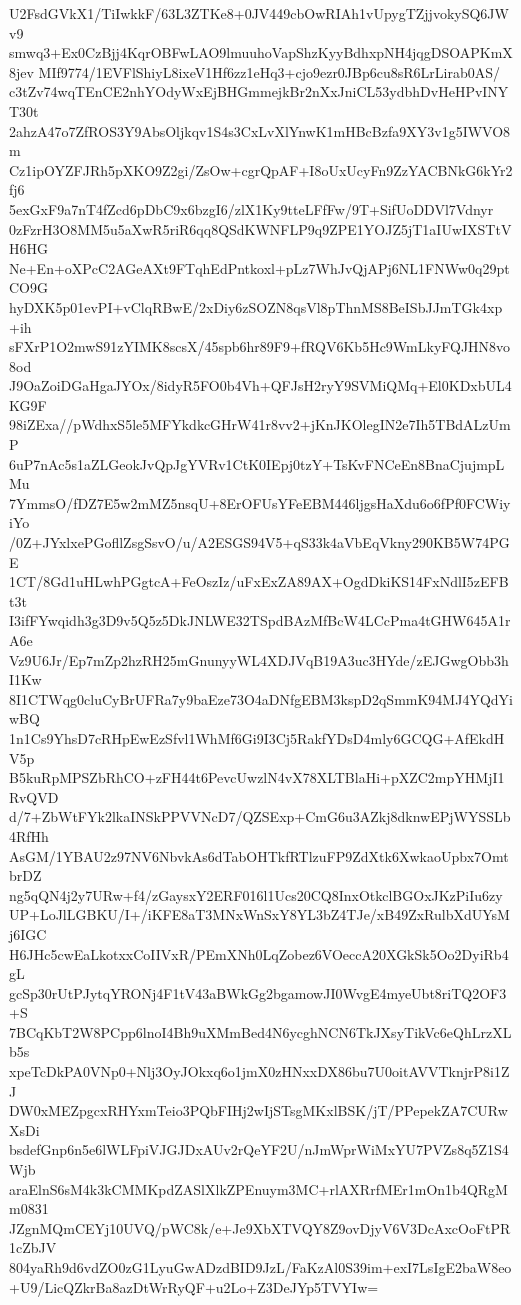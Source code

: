 U2FsdGVkX1/TiIwkkF/63L3ZTKe8+0JV449cbOwRIAh1vUpygTZjjvokySQ6JWv9
smwq3+Ex0CzBjj4KqrOBFwLAO9lmuuhoVapShzKyyBdhxpNH4jqgDSOAPKmX8jev
MIf9774/1EVFlShiyL8ixeV1Hf6zz1eHq3+cjo9ezr0JBp6cu8sR6LrLirab0AS/
c3tZv74wqTEnCE2nhYOdyWxEjBHGmmejkBr2nXxJniCL53ydbhDvHeHPvINYT30t
2ahzA47o7ZfROS3Y9AbsOljkqv1S4s3CxLvXlYnwK1mHBcBzfa9XY3v1g5IWVO8m
Cz1ipOYZFJRh5pXKO9Z2gi/ZsOw+cgrQpAF+I8oUxUcyFn9ZzYACBNkG6kYr2fj6
5exGxF9a7nT4fZcd6pDbC9x6bzgI6/zlX1Ky9tteLFfFw/9T+SifUoDDVl7Vdnyr
0zFzrH3O8MM5u5aXwR5riR6qq8QSdKWNFLP9q9ZPE1YOJZ5jT1aIUwIXSTtVH6HG
Ne+En+oXPcC2AGeAXt9FTqhEdPntkoxl+pLz7WhJvQjAPj6NL1FNWw0q29ptCO9G
hyDXK5p01evPI+vClqRBwE/2xDiy6zSOZN8qsVl8pThnMS8BeISbJJmTGk4xp+ih
sFXrP1O2mwS91zYIMK8scsX/45spb6hr89F9+fRQV6Kb5Hc9WmLkyFQJHN8vo8od
J9OaZoiDGaHgaJYOx/8idyR5FO0b4Vh+QFJsH2ryY9SVMiQMq+El0KDxbUL4KG9F
98iZExa//pWdhxS5le5MFYkdkcGHrW41r8vv2+jKnJKOlegIN2e7Ih5TBdALzUmP
6uP7nAc5s1aZLGeokJvQpJgYVRv1CtK0IEpj0tzY+TsKvFNCeEn8BnaCjujmpLMu
7YmmsO/fDZ7E5w2mMZ5nsqU+8ErOFUsYFeEBM446ljgsHaXdu6o6fPf0FCWiyiYo
/0Z+JYxlxePGofllZsgSsvO/u/A2ESGS94V5+qS33k4aVbEqVkny290KB5W74PGE
1CT/8Gd1uHLwhPGgtcA+FeOszIz/uFxExZA89AX+OgdDkiKS14FxNdlI5zEFBt3t
I3ifFYwqidh3g3D9v5Q5z5DkJNLWE32TSpdBAzMfBcW4LCcPma4tGHW645A1rA6e
Vz9U6Jr/Ep7mZp2hzRH25mGnunyyWL4XDJVqB19A3uc3HYde/zEJGwgObb3hI1Kw
8I1CTWqg0cluCyBrUFRa7y9baEze73O4aDNfgEBM3kspD2qSmmK94MJ4YQdYiwBQ
1n1Cs9YhsD7cRHpEwEzSfvl1WhMf6Gi9I3Cj5RakfYDsD4mly6GCQG+AfEkdHV5p
B5kuRpMPSZbRhCO+zFH44t6PevcUwzlN4vX78XLTBlaHi+pXZC2mpYHMjI1RvQVD
d/7+ZbWtFYk2lkaINSkPPVVNcD7/QZSExp+CmG6u3AZkj8dknwEPjWYSSLb4RfHh
AsGM/1YBAU2z97NV6NbvkAs6dTabOHTkfRTlzuFP9ZdXtk6XwkaoUpbx7OmtbrDZ
ng5qQN4j2y7URw+f4/zGaysxY2ERF016l1Ucs20CQ8InxOtkclBGOxJKzPiIu6zy
UP+LoJlLGBKU/I+/iKFE8aT3MNxWnSxY8YL3bZ4TJe/xB49ZxRulbXdUYsMj6IGC
H6JHc5cwEaLkotxxCoIIVxR/PEmXNh0LqZobez6VOeccA20XGkSk5Oo2DyiRb4gL
gcSp30rUtPJytqYRONj4F1tV43aBWkGg2bgamowJI0WvgE4myeUbt8riTQ2OF3+S
7BCqKbT2W8PCpp6lnoI4Bh9uXMmBed4N6ycghNCN6TkJXsyTikVc6eQhLrzXLb5s
xpeTcDkPA0VNp0+Nlj3OyJOkxq6o1jmX0zHNxxDX86bu7U0oitAVVTknjrP8i1ZJ
DW0xMEZpgcxRHYxmTeio3PQbFIHj2wIjSTsgMKxlBSK/jT/PPepekZA7CURwXsDi
bsdefGnp6n5e6lWLFpiVJGJDxAUv2rQeYF2U/nJmWprWiMxYU7PVZs8q5Z1S4Wjb
araElnS6sM4k3kCMMKpdZASlXlkZPEnuym3MC+rlAXRrfMEr1mOn1b4QRgMm0831
JZgnMQmCEYj10UVQ/pWC8k/e+Je9XbXTVQY8Z9ovDjyV6V3DcAxcOoFtPR1cZbJV
804yaRh9d6vdZO0zG1LyuGwADzdBID9JzL/FaKzAl0S39im+exI7LsIgE2baW8eo
+U9/LicQZkrBa8azDtWrRyQF+u2Lo+Z3DeJYp5TVYIw=
